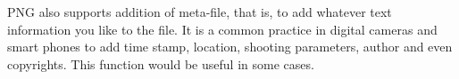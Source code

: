 \documentclass[catalog.tex]{subfiles}
\begin{document}
PNG also supports addition of meta-file, that is, to add whatever text information you like to the file. It is a common practice in digital cameras and smart phones to add time stamp, location, shooting parameters, author and even copyrights. This function would be useful in some cases.


\singlespacing
\printbibliography[title={References.},resetnumbers=true,heading=subbibliography]
\end{document}
